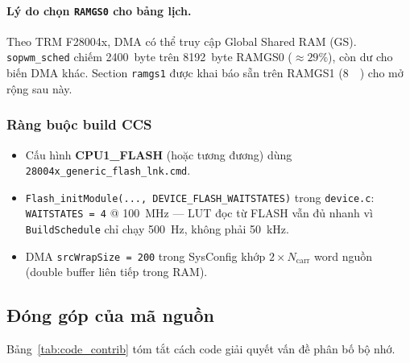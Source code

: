 \paragraph{Lý do chọn \texttt{RAMGS0} cho bảng lịch.}
Theo TRM F28004x, DMA có thể truy cập Global Shared RAM (GS). \texttt{sopwm\_sched} chiếm \SI{2400}{byte} trên \SI{8192}{byte} RAMGS0 ($\approx 29\%$), còn dư cho biến DMA khác. Section \texttt{ramgs1} được khai báo sẵn trên RAMGS1 (\SI{8}{\kibi\byte}) cho mở rộng sau này.

\subsubsection{Ràng buộc build CCS}

\begin{itemize}[noitemsep]
  \item Cấu hình \textbf{CPU1\_FLASH} (hoặc tương đương) dùng \texttt{28004x\_generic\_flash\_lnk.cmd}.
  \item \texttt{Flash\_initModule(..., DEVICE\_FLASH\_WAITSTATES)} trong \texttt{device.c}: \texttt{WAITSTATES = 4} @ \SI{100}{\mega\hertz} --- LUT đọc từ FLASH vẫn đủ nhanh vì \texttt{BuildSchedule} chỉ chạy \SI{500}{\hertz}, không phải \SI{50}{\kilo\hertz}.
  \item DMA \texttt{srcWrapSize = 200} trong SysConfig khớp $2 \times N_{\mathrm{carr}}$ word nguồn (double buffer liên tiếp trong RAM).
\end{itemize}

\subsection{Đóng góp của mã nguồn}

Bảng~\ref{tab:code_contrib} tóm tắt cách code giải quyết vấn đề phân bố bộ nhớ.

